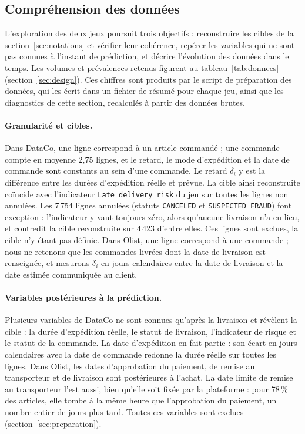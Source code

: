 \documentclass[11pt,a4paper]{article}
\theoremstyle{definition}
\begin{document}
\subsection{Compréhension des données}
\label{sec:data-understanding}

L'exploration des deux jeux poursuit trois objectifs : reconstruire les cibles de la section~\ref{sec:notations} et vérifier leur cohérence, repérer les variables qui ne sont pas connues à l'instant de prédiction, et décrire l'évolution des données dans le temps. Les volumes et prévalences retenus figurent au tableau~\ref{tab:donnees} (section~\ref{sec:design}). Ces chiffres sont produits par le script de préparation des données, qui les écrit dans un fichier de résumé pour chaque jeu, ainsi que les diagnostics de cette section, recalculés à partir des données brutes.

\paragraph{Granularité et cibles.} Dans DataCo, une ligne correspond à un article commandé ; une commande compte en moyenne 2,75 lignes, et le retard, le mode d'expédition et la date de commande sont constants au sein d'une commande. Le retard $\delta_i$ y est la différence entre les durées d'expédition réelle et prévue. La cible ainsi reconstruite coïncide avec l'indicateur \texttt{Late\_delivery\_risk} du jeu sur toutes les lignes non annulées. Les 7\,754 lignes annulées (statuts \texttt{CANCELED} et \texttt{SUSPECTED\_FRAUD}) font exception : l'indicateur y vaut toujours zéro, alors qu'aucune livraison n'a eu lieu, et contredit la cible reconstruite sur 4\,423 d'entre elles. Ces lignes sont exclues, la cible n'y étant pas définie. Dans Olist, une ligne correspond à une commande ; nous ne retenons que les commandes livrées dont la date de livraison est renseignée, et mesurons $\delta_i$ en jours calendaires entre la date de livraison et la date estimée communiquée au client.

\paragraph{Variables postérieures à la prédiction.} Plusieurs variables de DataCo ne sont connues qu'après la livraison et révèlent la cible : la durée d'expédition réelle, le statut de livraison, l'indicateur de risque et le statut de la commande. La date d'expédition en fait partie : son écart en jours calendaires avec la date de commande redonne la durée réelle sur toutes les lignes. Dans Olist, les dates d'approbation du paiement, de remise au transporteur et de livraison sont postérieures à l'achat. La date limite de remise au transporteur l'est aussi, bien qu'elle soit fixée par la plateforme : pour 78\,\% des articles, elle tombe à la même heure que l'approbation du paiement, un nombre entier de jours plus tard. Toutes ces variables sont exclues (section~\ref{sec:preparation}).
\end{document}

